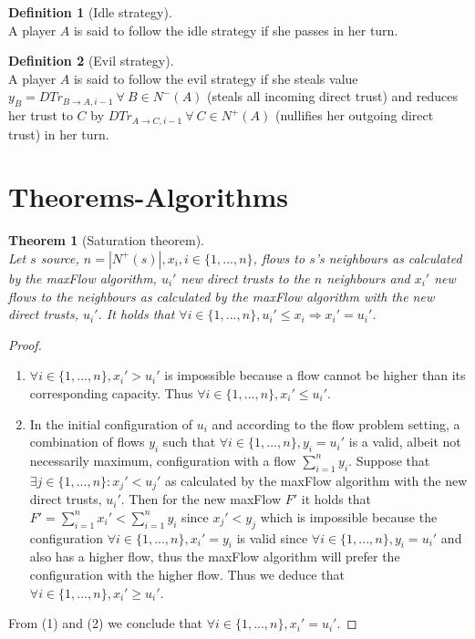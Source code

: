 \documentclass[11pt]{article}
\newtheorem{theorem}{Theorem}[section]
\theoremstyle{definition}
\newtheorem{definition}{Definition}[section]
\theoremstyle{corollary}
\begin{document}
      \begin{definition}[Idle strategy] \ \\
         A player $A$ is said to follow the idle strategy if she passes in her turn.
      \end{definition}
      \begin{definition}[Evil strategy] \ \\
         A player $A$ is said to follow the evil strategy if she steals value $y_B = DTr_{B \rightarrow A, i-1} \:
         \forall \: B \in N^{-}(A)$ (steals all incoming direct trust) and reduces her trust to $C$ by
         $DTr_{A \rightarrow C, i-1} \: \forall \: C \in N^{+}(A)$ (nullifies her outgoing direct trust) in her turn.
      \end{definition}
  \section{Theorems-Algorithms}
    \begin{theorem}[Saturation theorem] \ \\ 
    \label{saturation}
       Let $s$ source, $n = |N^{+}(s)|, x_i, i \in \{1,...,n\}$, flows to $s$'s neighbours as calculated by the
       maxFlow algorithm, $u_i'$ new direct trusts to the $n$ neighbours and $x_i'$ new flows to the neighbours
       as calculated by the maxFlow algorithm with the new direct trusts, $u_i'$. It holds that
       $\forall i \in \{1,...,n\}, u_i' \leq x_i \Rightarrow x_i' = u_i'$.
    \end{theorem}
    \begin{proof} \ 
       \begin{enumerate}
          \item $\forall i \in \{1,...,n\}, x_i' > u_i'$ is impossible because a flow cannot be higher than its
                corresponding capacity. Thus $\forall i \in \{1,...,n\}, x_i' \leq u_i'$.
          \item In the initial configuration of $u_i$ and according to the flow problem setting, a combination of flows
                $y_i$ such that $\forall i \in \{1,...,n\}, y_i = u_i'$ is a valid, albeit not necessarily maximum,
                configuration with a flow $\sum\limits_{i=1}^{n}y_i$. Suppose that $\exists j \in \{1,...,n\} : x_j'
                < u_j'$ as calculated by the maxFlow algorithm with the new direct trusts, $u_i'$. Then for the new
                maxFlow $F'$ it holds that $F' = \sum\limits_{i=1}^{n}x_i' < \sum\limits_{i=1}^{n}y_i$ since $x_j' < y_j$
                which is impossible because the configuration $\forall i \in \{1,...,n\}, x_i' = y_i$ is valid since
                $\forall i \in \{1,...,n\}, y_i = u_i'$ and also has a higher flow, thus the maxFlow algorithm will
                prefer the configuration with the higher flow. Thus we deduce that $\forall i \in \{1,...,n\},
                x_i' \geq u_i'$.
       \end{enumerate}
       From (1) and (2) we conclude that $\forall i \in \{1,...,n\}, x_i' = u_i'$.
    \end{proof}
\end{document}

